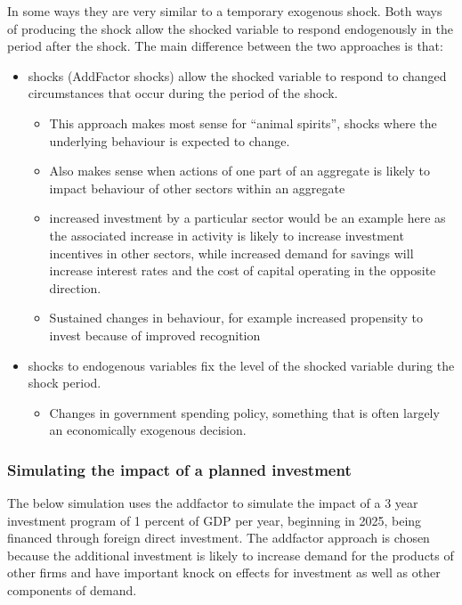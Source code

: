 \documentclass[letterpaper,10pt,english]{jupyterBook}
\begin{document}
\sphinxAtStartPar
In some ways they are very similar to a temporary exogenous shock. Both ways of producing the shock allow the shocked variable to respond endogenously in the period after the shock.  The main difference between the two approaches is that:
\begin{itemize}
\item {} 
\sphinxAtStartPar
{} shocks (Add\sphinxhyphen{}Factor shocks) allow the shocked variable to respond to changed circumstances that occur during the period of the shock.
\begin{itemize}
\item {} 
\sphinxAtStartPar
This approach makes most sense for “animal spirits”, shocks where the underlying behaviour is expected to change.

\item {} 
\sphinxAtStartPar
Also makes sense when actions of one part of an aggregate is likely to impact behaviour of other sectors within an aggregate

\item {} 
\sphinxAtStartPar
increased investment by a particular sector would be an example here as the associated increase in activity is likely to increase investment incentives in other sectors, while increased demand for savings will increase interest rates and the cost of capital operating in the opposite direction.

\item {} 
\sphinxAtStartPar
Sustained changes in behaviour, for example increased propensity to invest because of improved recognition

\end{itemize}

\item {} 
\sphinxAtStartPar
{} shocks to endogenous variables fix the level of the shocked variable during the shock period.
\begin{itemize}
\item {} 
\sphinxAtStartPar
Changes in government spending policy, something that is often largely an economically exogenous decision.

\end{itemize}

\end{itemize}


\subsubsection{Simulating the impact of a planned investment}
\label{\detokenize{content/06_WBModels/LoadingWBModel:simulating-the-impact-of-a-planned-investment}}
\sphinxAtStartPar
The below simulation uses the add\sphinxhyphen{}factor to simulate the impact of a 3 year investment  program of 1 percent of GDP per year, beginning in 2025, being financed through foreign direct investment.  The add\sphinxhyphen{}factor approach is chosen because the additional investment is likely to increase demand for the products of other firms and have important knock on effects for investment as well as other components of demand.
\end{document}
